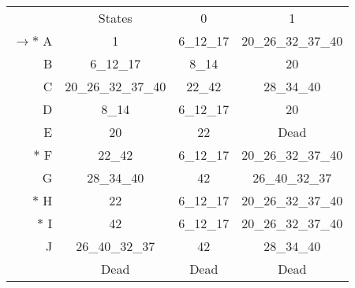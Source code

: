 \begin{tabular}[c]{r|c|c|c|} \cline{2-4}
    & States & 0 & 1 \\ \cline{2-4}
    $\rightarrow *$ A & 1 & 6\_12\_17 & 20\_26\_32\_37\_40 \\ \cline{2-4}
    B & 6\_12\_17 & 8\_14 & 20  \\ \cline{2-4}
    C & 20\_26\_32\_37\_40 & 22\_42 & 28\_34\_40 \\ \cline{2-4}
    D & 8\_14 & 6\_12\_17 & 20 \\ \cline{2-4}
    E & 20 & 22 & Dead \\ \cline{2-4}
    $*$ F & 22\_42 & 6\_12\_17 & 20\_26\_32\_37\_40 \\ \cline{2-4}
    G & 28\_34\_40 & 42 & 26\_40\_32\_37 \\ \cline{2-4}
    $*$ H & 22 & 6\_12\_17 & 20\_26\_32\_37\_40 \\ \cline{2-4}
    $*$ I & 42 & 6\_12\_17 & 20\_26\_32\_37\_40 \\ \cline{2-4}
    J & 26\_40\_32\_37 & 42 & 28\_34\_40 \\ \cline{2-4}
    & Dead & Dead & Dead \\ \cline{2-4}
\end{tabular}
